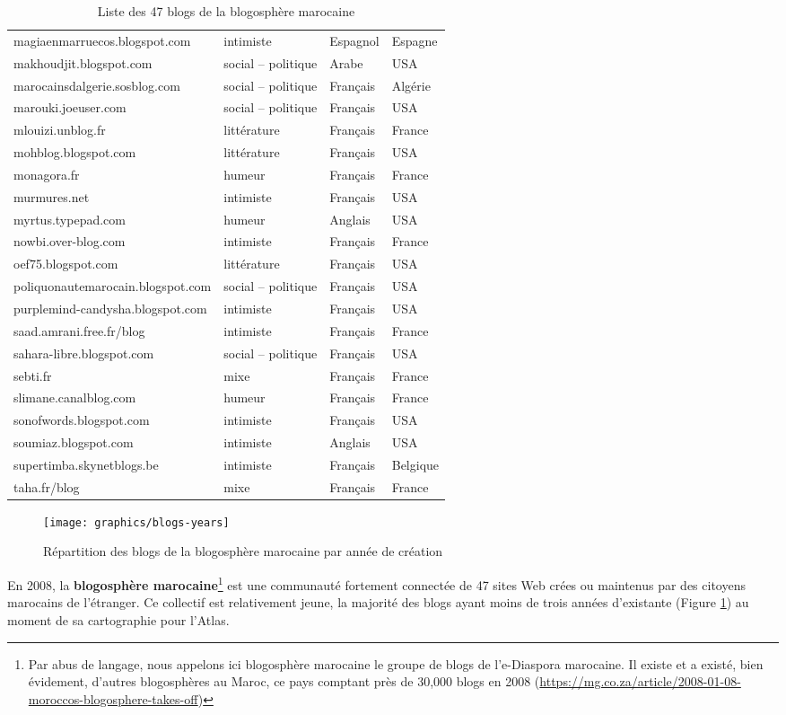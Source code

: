 \documentclass[symmetric,justified,marginals=raggedouter]{tufte-book}
\begin{document}
\begin{table*}
\begin{tabular}{llll}
    magiaenmarruecos.blogspot.com&intimiste&Espagnol&Espagne\\ 
    makhoudjit.blogspot.com&social – politique&Arabe&USA\\ 
    marocainsdalgerie.sosblog.com&social – politique&Français&Algérie\\ 
    marouki.joeuser.com&social – politique&Français&USA\\ 
    mlouizi.unblog.fr&littérature&Français&France\\ 
    mohblog.blogspot.com&littérature&Français&USA\\ 
    monagora.fr&humeur&Français&France\\ 
    murmures.net&intimiste&Français&USA\\ 
    myrtus.typepad.com&humeur&Anglais&USA\\ 
    nowbi.over-blog.com&intimiste&Français&France\\ 
    oef75.blogspot.com&littérature&Français&USA\\ 
    poliquonautemarocain.blogspot.com&social – politique&Français&USA\\ 
    purplemind-candysha.blogspot.com&intimiste&Français&USA\\ 
    saad.amrani.free.fr/blog&intimiste&Français&France\\ 
    sahara-libre.blogspot.com&social – politique&Français&USA\\ 
    sebti.fr&mixe&Français&France\\ 
    slimane.canalblog.com&humeur&Français&France\\ 
    sonofwords.blogspot.com&intimiste&Français&USA\\ 
    soumiaz.blogspot.com&intimiste&Anglais&USA\\ 
    supertimba.skynetblogs.be&intimiste&Français&Belgique\\ 
    taha.fr/blog&mixe&Français&France\\ 
  \bottomrule
  \end{tabular}
  \bigskip
  \caption{Liste des 47 blogs de la blogosphère marocaine}
\end{table*}  

\begin{figure}%
  \texttt{[image: graphics/blogs-years]}  
  \caption{Répartition des blogs de la blogosphère marocaine par année de création}
  \label{fig:blogs-years}
\end{figure}

\noindent En 2008, la \textbf{blogosphère marocaine}\footnote{Par abus de langage, nous appelons ici blogosphère marocaine le groupe de blogs de l'e-Diaspora marocaine. Il existe et a existé, bien évidement, d'autres blogosphères au Maroc, ce pays comptant près de 30,000 blogs en 2008 (\url{https://mg.co.za/article/2008-01-08-moroccos-blogosphere-takes-off})} est une communauté fortement connectée de 47 sites Web crées ou maintenus par des citoyens marocains de l'étranger. Ce collectif est relativement jeune, la majorité des blogs ayant moins de trois années d'existante (Figure \ref{fig:blogs-years}) au moment de sa cartographie pour l'Atlas.
\end{document}
